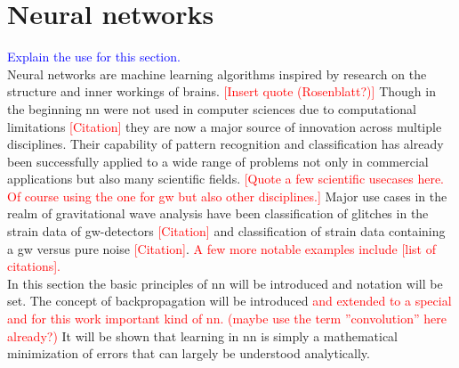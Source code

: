\section{Neural networks}
\textcolor{blue}{Explain the use for this section.}\\
\noindent Neural networks are machine learning algorithms inspired by research on the structure and inner workings of brains. \textcolor{red}{[Insert quote (Rosenblatt?)]} Though in the beginning \gls{nn} were not used in computer sciences due to computational limitations \textcolor{red}{[Citation]} they are now a major source of innovation across multiple disciplines. Their capability of pattern recognition and classification has already been successfully applied to a wide range of problems not only in commercial applications but also many scientific fields. \textcolor{red}{[Quote a few scientific usecases here. Of course using the one for gw but also other disciplines.]} Major use cases in the realm of gravitational wave analysis have been classification of glitches in the strain data of \gls{gw}-detectors \textcolor{red}{[Citation]} and classification of strain data containing a \gls{gw} versus pure noise \textcolor{red}{[Citation]}. \textcolor{red}{A few more notable examples include [list of citations].}\\
In this section the basic principles of \gls{nn} will be introduced and notation will be set. The concept of backpropagation will be introduced \textcolor{red}{and extended to a special and for this work important kind of \gls{nn}. (maybe use the term ''convolution'' here already?)} It will be shown that learning in \gls{nn} is simply a mathematical minimization of errors that can largely be understood analytically.

\begin{comment}
Neural networks have become a new and major player in data sciences over the past few years. They have proven to be very good at classification and interpolation. \textcolor{red}{[Insert ref]} Therefore and due to their computational efficiency they seem to be a compelling option even for scientific use cases and have been successfully applied to the classification and basic parameter estimation of \gls{gw}-data.\\
This sections aims to convey the basics of neural networks and the layers that are being utilized in this work. After having read this section it should be clear that neural networks are simply a mathematical model and that there is no magic involved. \textcolor{red}{(Maybe this is too prosa-like and/or should be put into the introduction)}
\end{comment}

